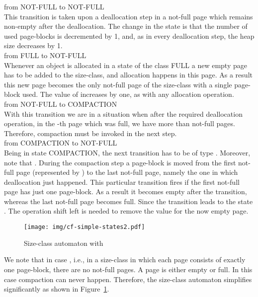 \documentclass{amsart}
\begin{document}
\noindent 
from
{\scriptsize{\textsf{NOT-FULL}}} to {\scriptsize{\textsf{NOT-FULL}}}\\

\noindent This transition is taken upon a deallocation step
in a not-full page which remains non-empty after the
deallocation. The change in the state is that the number of used page-blocks is decremented by 1, and, as in every deallocation step, the heap
size decreases by 1. \\



\noindent  from
{\scriptsize{\textsf{FULL}}} to {\scriptsize{\textsf{NOT-FULL}}}\\

\noindent Whenever an object is allocated in a state of
the class {\scriptsize{\textsf{FULL}}} a new empty page has to be
added to the size-class, and allocation happens in this page. As a
result this new page becomes the only not-full page of the size-class
with a single page-block used. The value of  increases by one, as
with any allocation operation.\\



\noindent  from
{\scriptsize{\textsf{NOT-FULL}}} to {\scriptsize{\textsf{COMPACTION}}}\\

\noindent With this transition we are in a situation when
after the required deallocation operation, in the -th page which was
full, we have more than  not-full pages. Therefore, compaction must
be invoked in the next step.\\



\noindent  from
{\scriptsize{\textsf{COMPACTION}}} to {\scriptsize{\textsf{NOT-FULL}}}\\

\noindent Being in state
{\scriptsize{\textsf{COMPACTION}}}, the next transition has to be of
type . Moreover, note that . During the compaction
step a page-block is moved from the first not-full page (represented by
) to the last not-full page, namely the one in which deallocation
just happened. This particular transition fires if the first not-full
page has just one page-block. As a result it becomes empty after the
transition, whereas the last not-full page becomes full. Since 
the transition leads to the state .
The operation shift left is needed to remove the value  for the now
empty page.

\begin{figure}
    \begin{center}
        \texttt{[image: img/cf-simple-states2.pdf]}
        \caption{Size-class automaton with }
            \label{fig:sc-simple-automaton}
    \end{center}
\end{figure}
We note that in case , i.e., in a size-class in which each page
consists of exactly one page-block, there are no not-full pages. A page is
either empty or full. In this case compaction can never happen.
Therefore, the size-class automaton simplifies significantly as shown in
Figure~\ref{fig:sc-simple-automaton}.
\end{document}
